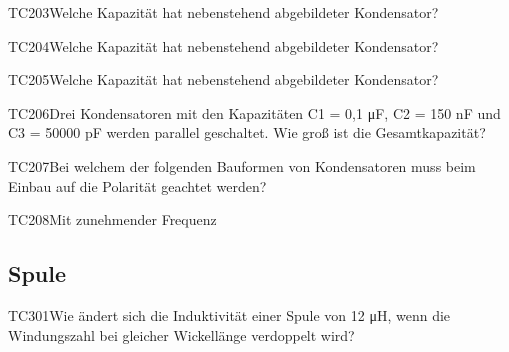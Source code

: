 \begin{question}{TC203}{Welche Kapazität hat nebenstehend abgebildeter Kondensator?}
\end{question}

\begin{question}{TC204}{Welche Kapazität hat nebenstehend abgebildeter Kondensator?}
\end{question}

\begin{question}{TC205}{Welche Kapazität hat nebenstehend abgebildeter Kondensator?}
\end{question}

\begin{question}{TC206}{Drei Kondensatoren mit den Kapazitäten C1 = 0,1 μF, C2 = 150 nF und C3 = 50000 pF werden parallel geschaltet. Wie groß ist die Gesamtkapazität?}
\end{question}

\begin{question}{TC207}{Bei welchem der folgenden Bauformen von Kondensatoren muss beim Einbau auf die Polarität geachtet werden?}
\end{question}

\begin{question}{TC208}{Mit zunehmender Frequenz}
\end{question}

\subsection{Spule}

\begin{question}{TC301}{Wie ändert sich die Induktivität einer Spule von 12 μH, wenn die Windungszahl bei gleicher Wickellänge verdoppelt wird?}
\end{question}

